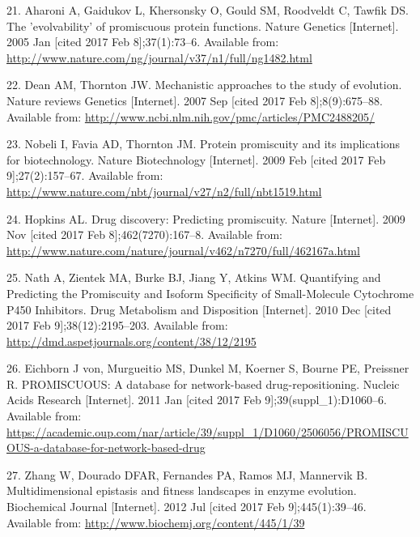 \documentclass[12pt,twoside]{reedthesis}
\begin{document}
  \hypertarget{ref-aharoni_evolvability_2005}{}
  21. Aharoni A, Gaidukov L, Khersonsky O, Gould SM, Roodveldt C, Tawfik
  DS. The 'evolvability' of promiscuous protein functions. Nature Genetics
  {[}Internet{]}. 2005 Jan {[}cited 2017 Feb 8{]};37(1):73--6. Available
  from: \url{http://www.nature.com/ng/journal/v37/n1/full/ng1482.html}
  
  \hypertarget{ref-dean_mechanistic_2007}{}
  22. Dean AM, Thornton JW. Mechanistic approaches to the study of
  evolution. Nature reviews Genetics {[}Internet{]}. 2007 Sep {[}cited
  2017 Feb 8{]};8(9):675--88. Available from:
  \url{http://www.ncbi.nlm.nih.gov/pmc/articles/PMC2488205/}
  
  \hypertarget{ref-nobeli_protein_2009}{}
  23. Nobeli I, Favia AD, Thornton JM. Protein promiscuity and its
  implications for biotechnology. Nature Biotechnology {[}Internet{]}.
  2009 Feb {[}cited 2017 Feb 9{]};27(2):157--67. Available from:
  \url{http://www.nature.com/nbt/journal/v27/n2/full/nbt1519.html}
  
  \hypertarget{ref-hopkins_drug_2009}{}
  24. Hopkins AL. Drug discovery: Predicting promiscuity. Nature
  {[}Internet{]}. 2009 Nov {[}cited 2017 Feb 8{]};462(7270):167--8.
  Available from:
  \url{http://www.nature.com/nature/journal/v462/n7270/full/462167a.html}
  
  \hypertarget{ref-nath_quantifying_2010}{}
  25. Nath A, Zientek MA, Burke BJ, Jiang Y, Atkins WM. Quantifying and
  Predicting the Promiscuity and Isoform Specificity of Small-Molecule
  Cytochrome P450 Inhibitors. Drug Metabolism and Disposition
  {[}Internet{]}. 2010 Dec {[}cited 2017 Feb 9{]};38(12):2195--203.
  Available from: \url{http://dmd.aspetjournals.org/content/38/12/2195}
  
  \hypertarget{ref-von_eichborn_promiscuous_2011}{}
  26. Eichborn J von, Murgueitio MS, Dunkel M, Koerner S, Bourne PE,
  Preissner R. PROMISCUOUS: A database for network-based
  drug-repositioning. Nucleic Acids Research {[}Internet{]}. 2011 Jan
  {[}cited 2017 Feb 9{]};39(suppl\_1):D1060--6. Available from:
  \url{https://academic.oup.com/nar/article/39/suppl_1/D1060/2506056/PROMISCUOUS-a-database-for-network-based-drug}
  
  \hypertarget{ref-zhang_multidimensional_2012}{}
  27. Zhang W, Dourado DFAR, Fernandes PA, Ramos MJ, Mannervik B.
  Multidimensional epistasis and fitness landscapes in enzyme evolution.
  Biochemical Journal {[}Internet{]}. 2012 Jul {[}cited 2017 Feb
  9{]};445(1):39--46. Available from:
  \url{http://www.biochemj.org/content/445/1/39}
  
\end{document}
